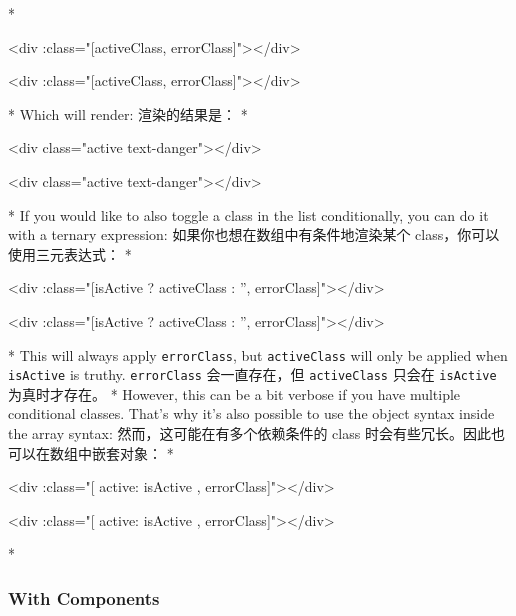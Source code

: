 \begin{paracol}{2}
\switchcolumn[0]*%
\begin{codeHtml}
<div :class="[activeClass, errorClass]"></div>
\end{codeHtml}
\switchcolumn
\begin{codeHtml}
<div :class="[activeClass, errorClass]"></div>
\end{codeHtml}
\switchcolumn[0]*%
Which will render:
\switchcolumn
渲染的结果是：
\switchcolumn[0]*%
\begin{codeHtml}
<div class="active text-danger"></div>
\end{codeHtml}
\switchcolumn
\begin{codeHtml}
<div class="active text-danger"></div>
\end{codeHtml}
\switchcolumn[0]*%
If you would like to also toggle a class in the list conditionally, you
can do it with a ternary expression:
\switchcolumn
如果你也想在数组中有条件地渲染某个 class，你可以使用三元表达式：
\switchcolumn[0]*%
\begin{codeHtml}
<div :class="[isActive ? activeClass : '', errorClass]"></div>
\end{codeHtml}
\switchcolumn
\begin{codeHtml}
<div :class="[isActive ? activeClass : '', errorClass]"></div>
\end{codeHtml}
\switchcolumn[0]*%
This will always apply \texttt{errorClass}, but \texttt{activeClass}
will only be applied when \texttt{isActive} is truthy.
\switchcolumn
\texttt{errorClass} 会一直存在，但 \texttt{activeClass} 只会在
\texttt{isActive} 为真时才存在。
\switchcolumn[0]*%
However, this can be a bit verbose if you have multiple conditional
classes. That's why it's also possible to use the object syntax inside
the array syntax:
\switchcolumn
然而，这可能在有多个依赖条件的 class
时会有些冗长。因此也可以在数组中嵌套对象：
\switchcolumn[0]*%
\begin{codeHtml}
<div :class="[{ active: isActive }, errorClass]"></div>
\end{codeHtml}
\switchcolumn
\begin{codeHtml}
<div :class="[{ active: isActive }, errorClass]"></div>
\end{codeHtml}
\switchcolumn[0]*%
\subsubsection{With Components}
\switchcolumn

\end{paracol}
